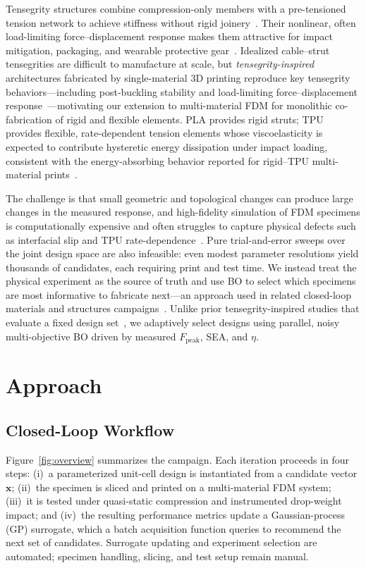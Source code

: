 \documentclass[10pt]{article}
\begin{document}
Tensegrity structures combine compression-only members with a
pre-tensioned tension network to achieve stiffness without rigid
joinery~\citep{skelton2009tensegrity}. Their
nonlinear, often load-limiting force--displacement response makes them
attractive for impact mitigation, packaging, and wearable protective
gear~\citep{pajunen2019design}. Idealized
cable--strut tensegrities are difficult to manufacture at scale, but
\emph{tensegrity-inspired} architectures fabricated by single-material
3D printing reproduce key tensegrity behaviors---including
post-buckling stability and load-limiting force--displacement
response~\citep{pajunen2019design}---motivating our extension to
multi-material FDM for monolithic co-fabrication of rigid and flexible
elements. PLA provides rigid struts; TPU provides flexible,
rate-dependent tension elements whose viscoelasticity is expected to
contribute hysteretic energy dissipation under impact loading,
consistent with the energy-absorbing behavior reported for rigid--TPU
multi-material prints~\citep{khatri2024energy}.

The challenge is that small geometric and topological changes can
produce large changes in the measured response, and high-fidelity
simulation of FDM specimens is computationally expensive and often
struggles to capture physical defects such as interfacial slip and
TPU rate-dependence~\citep{mo2023accelerated}. Pure
trial-and-error sweeps over the joint design space are also infeasible:
even modest parameter resolutions yield thousands of candidates, each
requiring print and test time. We instead treat the physical
experiment as the source of truth and use BO to select which specimens
are most informative to fabricate next---an approach used in related
closed-loop materials and structures
campaigns~\citep{mo2023accelerated,low2024evolution}.
Unlike prior tensegrity-inspired studies that evaluate a fixed design
set~\citep{pajunen2019design,khatri2024energy}, we adaptively select
designs using parallel, noisy multi-objective BO driven by measured
$F_{\mathrm{peak}}$, SEA, and $\eta$.

\section{Approach}
\subsection{Closed-Loop Workflow}
Figure~\ref{fig:overview} summarizes the campaign. Each iteration
proceeds in four steps: (i)~a parameterized unit-cell design is
instantiated from a candidate vector $\mathbf{x}$; (ii)~the specimen
is sliced and printed on a multi-material FDM system; (iii)~it is
tested under quasi-static compression and instrumented drop-weight
impact; and (iv)~the resulting performance metrics update a
Gaussian-process (GP) surrogate, which a batch acquisition function
queries to recommend the next set of candidates. Surrogate updating
and experiment selection are automated; specimen handling, slicing,
and test setup remain manual.
\end{document}
